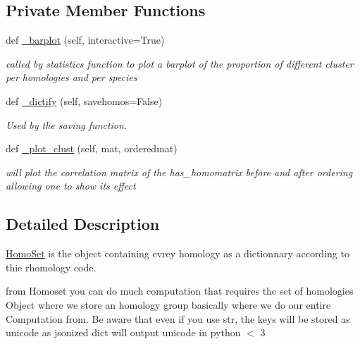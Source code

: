 \subsection*{Private Member Functions}
\begin{DoxyCompactItemize}
\item 
def \mbox{\hyperlink{class_py_c_u_b_1_1homoset_1_1_homo_set_af6e8927ae33e2785ab21293a59628946}{\+\_\+barplot}} (self, interactive=True)
\begin{DoxyCompactList}\small\item\em called by statistics function to plot a barplot of the proportion of different cluster per homologies and per species \end{DoxyCompactList}\item 
def \mbox{\hyperlink{class_py_c_u_b_1_1homoset_1_1_homo_set_afd51ea6276ecae41960d426ce72755b0}{\+\_\+dictify}} (self, savehomos=False)
\begin{DoxyCompactList}\small\item\em Used by the saving function. \end{DoxyCompactList}\item 
def \mbox{\hyperlink{class_py_c_u_b_1_1homoset_1_1_homo_set_a795cfd3187026bde3c065aab9fe09642}{\+\_\+plot\+\_\+clust}} (self, mat, orderedmat)
\begin{DoxyCompactList}\small\item\em will plot the correlation matrix of the has\+\_\+homomatrix before and after ordering allowing one to show its effect \end{DoxyCompactList}\end{DoxyCompactItemize}


\subsection{Detailed Description}
\mbox{\hyperlink{class_py_c_u_b_1_1homoset_1_1_homo_set}{Homo\+Set}} is the object containing evrey homology as a dictionnary according to thie rhomology code. 

from Homoset you can do much computation that requires the set of homologies Object where we store an homology group basically where we do our entire Computation from. Be aware that even if you use str, the keys will be stored as unicode as jsonized dict will output unicode in python $<$ 3


